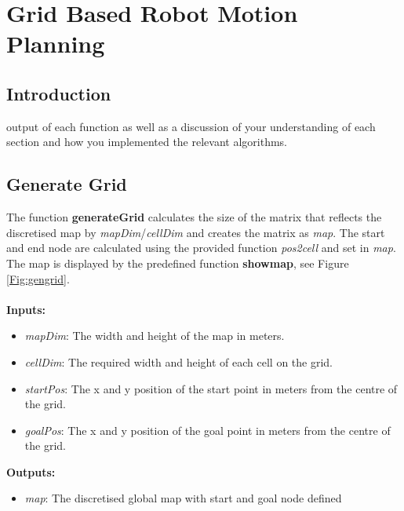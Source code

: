\documentclass[Space3_Assign3.tex]{subfile}
\begin{document}
\section{Grid Based Robot Motion Planning} \label{Sec:Question1}
\subsection{Introduction}

output of each function as well as a discussion of your understanding of each section and how
you implemented the relevant algorithms.

\subsection{Generate Grid}\label{Sec:gengrid}
The function \textbf{generateGrid} calculates the size of the matrix that reflects the discretised map by \textit{mapDim}/\textit{cellDim} and creates the matrix as \textit{map}. The start and end node are calculated using the provided function \textit{pos2cell} and set in \textit{map}. The map is displayed by the predefined function \textbf{showmap}, see Figure \ref{Fig:gengrid}.\\\\
\textbf{Inputs:}
\begin{itemize}
\item \textit{mapDim}: The width and height of the map in meters.
\item \textit{cellDim}: The required width and height of each cell on the grid.
\item \textit{startPos}: The x and y position of the start point in meters from the centre of the grid.
\item \textit{goalPos}: The x and y position of the goal point in meters from the centre of the grid.
\end{itemize}
\textbf{Outputs:}
\begin{itemize}
\item \textit{map}: The discretised global map with start and goal node defined
\end{itemize}

\end{document}
